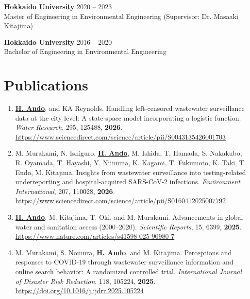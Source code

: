 \documentclass[11pt,a4paper]{article}
\begin{document}
\textbf{Hokkaido University} \hfill 2020 -- 2023 \\
Master of Engineering in Environmental Engineering (Supervisor: Dr. Masaaki Kitajima)

\textbf{Hokkaido University} \hfill 2016 -- 2020 \\
Bachelor of Engineering in Environmental Engineering

\vspace{10pt}


\section{Publications}

\begin{enumerate}[label=\arabic*., series=pubcount, leftmargin=1.5em, nosep]
    \small
    \sloppy %
    \setcounter{enumi}{16}

     \item \textbf{\underline{H. Ando}}, and KA Reynolds. Handling left-censored wastewater surveillance data at the city level: A state-space model incorporating a logistic function. \textit{Water Research}, 295, 125488, \textbf{2026}. \url{https://www.sciencedirect.com/science/article/pii/S0043135426001703}
    \addtocounter{enumi}{-2}

    \item M. Murakami, N. Ishiguro, \textbf{\underline{H. Ando}}, M. Ishida, T. Hamada, S. Nakakubo, R. Oyamada, T. Hayashi, Y. Niinuma, K. Kagami, T. Fukumoto, K. Taki, T. Endo, M. Kitajima. Insights from wastewater surveillance into testing-related underreporting and hospital-acquired SARS-CoV-2 infections. \textit{Environment International}, 207, 110028, \textbf{2026}. \url{https://www.sciencedirect.com/science/article/pii/S0160412025007792}
    \addtocounter{enumi}{-2}

    \item \textbf{\underline{H. Ando}}, M. Kitajima, T. Oki, and M. Murakami. Advancements in global water and sanitation access (2000–2020). \textit{Scientific Reports}, 15, 6399, \textbf{2025}. \url{https://www.nature.com/articles/s41598-025-90980-7}
    \addtocounter{enumi}{-2}

    \item M. Murakami, S. Nomura, \textbf{\underline{H. Ando}}, and M. Kitajima. Perceptions and responses to COVID-19 through wastewater surveillance information and online search behavior: A randomized controlled trial. \textit{International Journal of Disaster Risk Reduction}, 118, 105224, \textbf{2025}. \url{https://doi.org/10.1016/j.ijdrr.2025.105224}
    \addtocounter{enumi}{-2}


\end{enumerate}
\end{document}
